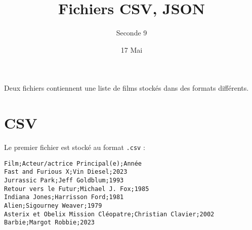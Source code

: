 \documentclass{exam}
\title{Fichiers CSV, JSON}
\date{17 Mai}
\author{Seconde 9}
\begin{document}
\maketitle
\thispagestyle{head}

Deux fichiers contiennent une liste de films stockés dans des formats différents.

\section{CSV}

Le premier fichier est stocké au format \verb|.csv| :

\begin{verbatim}
Film;Acteur/actrice Principal(e);Année
Fast and Furious X;Vin Diesel;2023
Jurrassic Park;Jeff Goldblum;1993
Retour vers le Futur;Michael J. Fox;1985
Indiana Jones;Harrisson Ford;1981
Alien;Sigourney Weaver;1979
Asterix et Obelix Mission Cléopatre;Christian Clavier;2002
Barbie;Margot Robbie;2023
\end{verbatim}
\end{document}
